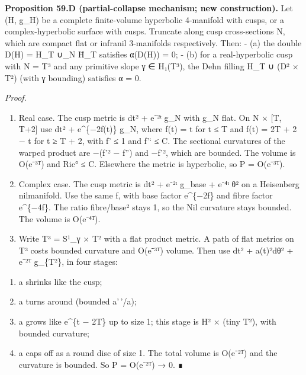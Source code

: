 \documentclass[
  10pt,
]{report}
\providecommand{\tightlist}{%
  \setlength{\itemsep}{0pt}\setlength{\parskip}{0pt}}
\begin{document}
\textbf{Proposition 59.D (partial-collapse mechanism; new
construction).} Let (H, g\_H) be a complete finite-volume hyperbolic
4-manifold with cusps, or a complex-hyperbolic surface with cusps.
Truncate along cusp cross-sections N, which are compact flat or infranil
3-manifolds respectively. Then: - (a) the double D(H) = H\_T ∪\_N H̄\_T
satisfies α(D(H)) = 0; - (b) for a real-hyperbolic cusp with N = T³ and
any primitive slope γ ∈ H₁(T³), the Dehn filling H\_T ∪ (D² × T²) (with
γ bounding) satisfies α = 0.

\emph{Proof.}

\begin{enumerate}
\def\labelenumi{(\alph{enumi})}
\item
  Real case. The cusp metric is dt² + e⁻²ᵗ g\_N with g\_N flat. On N ×
  {[}T, T+2{]} use dt² + e\^{}\{−2f(t)\} g\_N, where f(t) = t for t ≤ T
  and f(t) = 2T + 2 − t for t ≥ T + 2, with \textbar f'\textbar{} ≤ 1
  and \textbar f'`\textbar{} ≤ C. The sectional curvatures of the warped
  product are −(f'² − f'') and −f'², which are bounded. The volume is
  O(e⁻³ᵀ) and \textbar Ric°\textbar{} ≤ C. Elsewhere the metric is
  hyperbolic, so P = O(e⁻³ᵀ).
\item
  Complex case. The cusp metric is dt² + e⁻²ᵗ g\_base + e⁻⁴ᵗ θ² on a
  Heisenberg nilmanifold. Use the same f, with base factor e\^{}\{−2f\}
  and fibre factor e\^{}\{−4f\}. The ratio fibre/base² stays 1, so the
  Nil curvature stays bounded. The volume is O(e⁻⁴ᵀ).
\item
  Write T³ = S¹\_γ × T² with a flat product metric. A path of flat
  metrics on T³ costs bounded curvature and O(e⁻³ᵀ) volume. Then use dt²
  + a(t)²dθ² + e⁻²ᵀ g\_\{T²\}, in four stages:
\end{enumerate}

\begin{enumerate}
\def\labelenumi{\arabic{enumi}.}
\tightlist
\item
  a shrinks like the cusp;
\item
  a turns around (bounded a'\,'/a);
\item
  a grows like e\^{}\{t − 2T\} up to size 1; this stage is H² × (tiny
  T²), with bounded curvature;
\item
  a caps off as a round disc of size 1. The total volume is O(e⁻²ᵀ) and
  the curvature is bounded. So P = O(e⁻²ᵀ) → 0. ∎
\end{enumerate}
\end{document}
